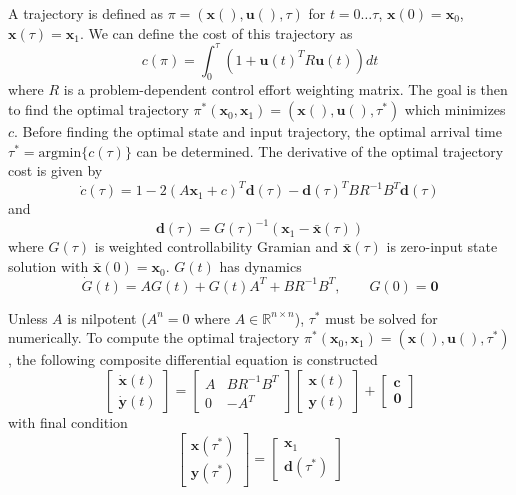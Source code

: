 \documentclass[letterpaper, 10 pt, conference]{ieeeconf}\usepackage[margin=1in]{geometry}
\begin{document}
A trajectory is defined as $\pi = (\mathbf{x}(), \mathbf{u}(), \tau)$ for $t = 0\ldots \tau$, $\mathbf{x}(0) = \mathbf{x}_0$, $\mathbf{x}(\tau) = \mathbf{x}_1$. We can define the cost of this trajectory as
\begin{equation}
	c(\pi) = \int_0^\tau (1 + \mathbf{u}(t)^T R \mathbf{u}(t))dt
\end{equation}
where $R$ is a problem-dependent control effort weighting matrix. The goal is then to find the optimal trajectory $\pi^*(\mathbf{x}_0, \mathbf{x}_1) = (\mathbf{x}(), \mathbf{u}(), \tau^*)$ which minimizes $c$. Before finding the optimal state and input trajectory, the optimal arrival time $\tau^* = \text{argmin}\{ c(\tau) \}$ can be determined. The derivative of the optimal trajectory cost is given by
\begin{equation}
	\dot{c}(\tau) = 1 - 2(A \mathbf{x}_1 + c)^T \mathbf{d}(\tau) - \mathbf{d}(\tau)^T B R^{-1} B^T \mathbf{d}(\tau)
\end{equation}
and 
\begin{equation}
	\mathbf{d}(\tau) = G(\tau)^{-1} (\mathbf{x}_1 - \bar{\mathbf{x}}(\tau))
\end{equation}
where $G(\tau)$ is weighted controllability Gramian and $\bar{\mathbf{x}}(\tau)$  is zero-input state solution with $\bar{\mathbf{x}}(0) = \mathbf{x}_0$. $G(t)$ has dynamics
\begin{equation}
	\dot{G}(t) = A G(t) + G(t) A^T + B R^{-1} B^T, \qquad G(0) = \mathbf{0}
\end{equation}

Unless $A$ is nilpotent ($A^n = 0$ where $A \in \mathbb{R}^{n \times n}$), $\tau^*$ must be solved for numerically. To compute the optimal trajectory $\pi^*(\mathbf{x}_0, \mathbf{x}_1) = (\mathbf{x}(), \mathbf{u}(), \tau^*)$, the following composite differential equation is constructed
\begin{equation}
	\begin{bmatrix}
		\dot{\mathbf{x}}(t) \\ \dot{\mathbf{y}}(t)
	\end{bmatrix} = \begin{bmatrix}
		A & B R^{-1} B^T \\ 0 & -A^T
	\end{bmatrix} \begin{bmatrix}
		\mathbf{x}(t) \\ \mathbf{y}(t)
	\end{bmatrix} + \begin{bmatrix}
		\mathbf{c} \\ \mathbf{0}
	\end{bmatrix}
\end{equation}
with final condition
\begin{equation}
	\begin{bmatrix}
		\mathbf{x}(\tau^*) \\ \mathbf{y}(\tau^*)
	\end{bmatrix} = \begin{bmatrix}
		\mathbf{x}_1 \\ \mathbf{d}(\tau^*)
	\end{bmatrix}
\end{equation}
\end{document}
